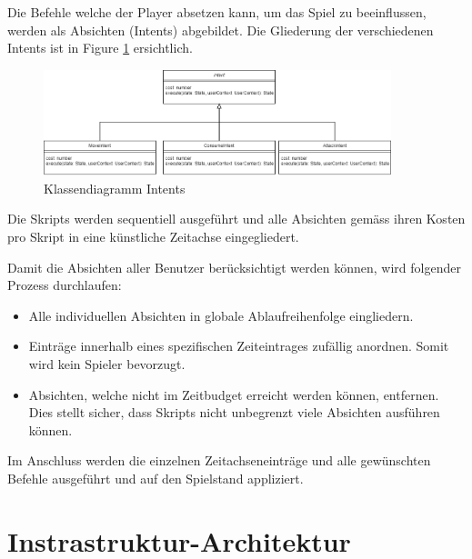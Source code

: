 \documentclass[11pt,a4paper,german]{scrartcl}
\let\oldsection\section
\renewcommand\section{\clearpage\oldsection}
\begin{document}
Die Befehle welche der Player absetzen kann, um das Spiel zu beeinflussen, werden als Absichten (Intents) abgebildet.
Die Gliederung der verschiedenen Intents ist in Figure \ref{fig:classDiagramIntents} ersichtlich.

\begin{figure}[h]
  \centering
  \includegraphics[width=0.9\textwidth]{Intent}
  \caption{Klassendiagramm Intents}
  \label{fig:classDiagramIntents}
\end{figure}

Die Skripts werden sequentiell ausgeführt und alle Absichten gemäss ihren Kosten pro Skript in eine künstliche Zeitachse eingegliedert.

Damit die Absichten aller Benutzer berücksichtigt werden können, wird folgender Prozess durchlaufen:
\begin{itemize}
  \item Alle individuellen Absichten in globale Ablaufreihenfolge eingliedern.
  \item Einträge innerhalb eines spezifischen Zeiteintrages zufällig anordnen. Somit wird kein Spieler bevorzugt.
  \item Absichten, welche nicht im Zeitbudget erreicht werden können, entfernen. Dies stellt sicher, dass Skripts nicht unbegrenzt viele Absichten ausführen können.
\end{itemize}

Im Anschluss werden die einzelnen Zeitachseneinträge und alle gewünschten Befehle ausgeführt und auf den Spielstand appliziert.

\section{Instrastruktur-Architektur}
\label{InfrastructureArchitecture}
\end{document}
